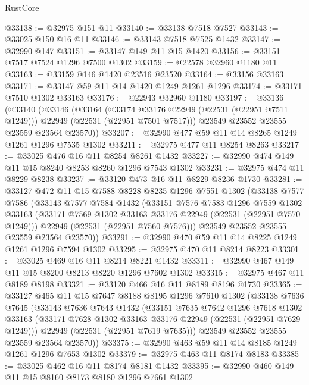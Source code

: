 \begin{lexlean}{RustCore}
\begin{coremodule}
@33138 := @32975 @151 @11
@33140 := @33138 @7518 @7527
@33143 := @33025 @150 @16 @11
@33146 := @33143 @7518 @7525 @1432
@33147 := @32990 @147
@33151 := @33147 @149 @11 @15 @1420
@33156 := @33151 @7517 @7524 @1296 @7500 @1302
@33159 := @22578 @32960 @1180 @11
@33163 := @33159 @146 @1420 @23516 @23520
@33164 := @33156 @33163
@33171 := @33147 @59 @11 @14 @1420 @1249 @1261 @1296
@33174 := @33171 @7510 @1302 @33163
@33176 := @22943 @32960 @1180
@33197 := @33136
    (@33140
      (@33146
        (@33164
          (@33174 @33176 @22949 (@22531 (@22951 @7511 @1249)))
          @22949
          (@22531 (@22951 @7501 @7517)))
        @23549
        @23552
        @23555
        @23559
        @23564
        @23570))
@33207 := @32990 @477 @59 @11 @14 @8265 @1249 @1261 @1296 @7535 @1302
@33211 := @32975 @477 @11 @8254 @8263
@33217 := @33025 @476 @16 @11 @8254 @8261 @1432
@33227 := @32990 @474 @149 @11 @15 @8240 @8253 @8260 @1296 @7543 @1302
@33231 := @32975 @474 @11 @8229 @8238
@33237 := @33120 @473 @16 @11 @8229 @8236 @1730
@33281 := @33127
    @472
    @11
    @15
    @7588
    @8228
    @8235
    @1296
    @7551
    @1302
    (@33138
      @7577
      @7586
      (@33143
        @7577
        @7584
        @1432
        (@33151
          @7576
          @7583
          @1296
          @7559
          @1302
          @33163
          (@33171 @7569 @1302 @33163 @33176 @22949 (@22531 (@22951 @7570 @1249)))
          @22949
          (@22531 (@22951 @7560 @7576)))
        @23549
        @23552
        @23555
        @23559
        @23564
        @23570))
@33291 := @32990 @470 @59 @11 @14 @8225 @1249 @1261 @1296 @7594 @1302
@33295 := @32975 @470 @11 @8214 @8223
@33301 := @33025 @469 @16 @11 @8214 @8221 @1432
@33311 := @32990 @467 @149 @11 @15 @8200 @8213 @8220 @1296 @7602 @1302
@33315 := @32975 @467 @11 @8189 @8198
@33321 := @33120 @466 @16 @11 @8189 @8196 @1730
@33365 := @33127
    @465
    @11
    @15
    @7647
    @8188
    @8195
    @1296
    @7610
    @1302
    (@33138
      @7636
      @7645
      (@33143
        @7636
        @7643
        @1432
        (@33151
          @7635
          @7642
          @1296
          @7618
          @1302
          @33163
          (@33171 @7628 @1302 @33163 @33176 @22949 (@22531 (@22951 @7629 @1249)))
          @22949
          (@22531 (@22951 @7619 @7635)))
        @23549
        @23552
        @23555
        @23559
        @23564
        @23570))
@33375 := @32990 @463 @59 @11 @14 @8185 @1249 @1261 @1296 @7653 @1302
@33379 := @32975 @463 @11 @8174 @8183
@33385 := @33025 @462 @16 @11 @8174 @8181 @1432
@33395 := @32990 @460 @149 @11 @15 @8160 @8173 @8180 @1296 @7661 @1302

\end{coremodule}
\end{lexlean}
